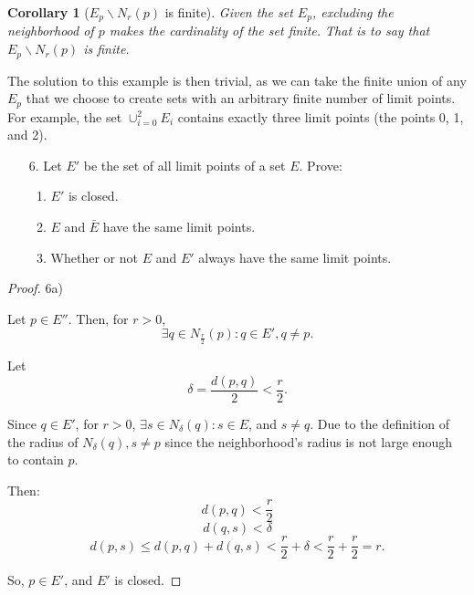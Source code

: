 \documentclass[10pt]{article}
\theoremstyle{definition}
\theoremstyle{plain}
\newtheorem*{corollary*}{Corollary}
\begin{document}
\begin{corollary*}[$E_p\backslash N_r(p)$ is finite]
Given the set $E_p$, excluding the neighborhood of $p$ makes the cardinality of the set finite. That is to say that $E_p\backslash N_r(p)$ is finite.
\end{corollary*}

The solution to this example is then trivial, as we can take the finite union of any $E_p$ that we choose to create sets with an arbitrary finite number of limit points. For example, the set $\cup^2_{i=0} E_i$ contains exactly three limit points (the points 0, 1, and 2).


\pagebreak



\begin{enumerate}
\item[6.] Let $E'$ be the set of all limit points of a set $E$. Prove:
\begin{enumerate}
  \item $E'$ is closed.
  \item $E$ and $\bar{E}$ have the same limit points.
  \item Whether or not $E$ and $E'$ always have the same limit points.
\end{enumerate}
\end{enumerate}

\begin{proof}
6a)

Let $p\in E''$. Then, for $r>0$, 
$$\exists q\in N_{\frac{r}{2}} (p):q\in E', q\neq p.$$

Let 
$$\delta = \frac{d(p,q)}{2} < \frac{r}{2}.$$

Since $q\in E'$, for $r>0$, $\exists s\in N_\delta (q): s\in E$, and  $s\neq q$. Due to the definition of the radius of $N_\delta (q), s\neq p$ since the neighborhood's radius is not large enough to contain $p$.

Then:
$$d(p,q) < \frac{r}{2}$$
$$d(q,s) < \delta$$
$$d(p,s) \leq d(p,q) + d(q,s) < \frac{r}{2} + \delta < \frac{r}{2} + \frac{r}{2} = r.$$

So, $p\in E'$, and $E'$ is closed.
\end{proof}
\end{document}
